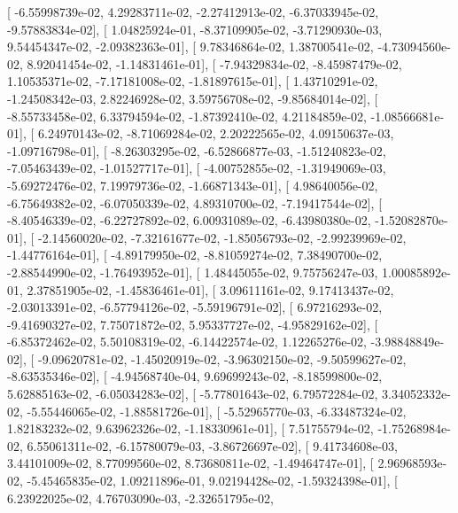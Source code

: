 \documentclass{article}
\begin{document}
       [ -6.55998739e-02,   4.29283711e-02,  -2.27412913e-02,
         -6.37033945e-02,  -9.57883834e-02],
       [  1.04825924e-01,  -8.37109905e-02,  -3.71290930e-03,
          9.54454347e-02,  -2.09382363e-01],
       [  9.78346864e-02,   1.38700541e-02,  -4.73094560e-02,
          8.92041454e-02,  -1.14831461e-01],
       [ -7.94329834e-02,  -8.45987479e-02,   1.10535371e-02,
         -7.17181008e-02,  -1.81897615e-01],
       [  1.43710291e-02,  -1.24508342e-03,   2.82246928e-02,
          3.59756708e-02,  -9.85684014e-02],
       [ -8.55733458e-02,   6.33794594e-02,  -1.87392410e-02,
          4.21184859e-02,  -1.08566681e-01],
       [  6.24970143e-02,  -8.71069284e-02,   2.20222565e-02,
          4.09150637e-03,  -1.09716798e-01],
       [ -8.26303295e-02,  -6.52866877e-03,  -1.51240823e-02,
         -7.05463439e-02,  -1.01527717e-01],
       [ -4.00752855e-02,  -1.31949069e-03,  -5.69272476e-02,
          7.19979736e-02,  -1.66871343e-01],
       [  4.98640056e-02,  -6.75649382e-02,  -6.07050339e-02,
          4.89310700e-02,  -7.19417544e-02],
       [ -8.40546339e-02,  -6.22727892e-02,   6.00931089e-02,
         -6.43980380e-02,  -1.52082870e-01],
       [ -2.14560020e-02,  -7.32161677e-02,  -1.85056793e-02,
         -2.99239969e-02,  -1.44776164e-01],
       [ -4.89179950e-02,  -8.81059274e-02,   7.38490700e-02,
         -2.88544990e-02,  -1.76493952e-01],
       [  1.48445055e-02,   9.75756247e-03,   1.00085892e-01,
          2.37851905e-02,  -1.45836461e-01],
       [  3.09611161e-02,   9.17413437e-02,  -2.03013391e-02,
         -6.57794126e-02,  -5.59196791e-02],
       [  6.97216293e-02,  -9.41690327e-02,   7.75071872e-02,
          5.95337727e-02,  -4.95829162e-02],
       [ -6.85372462e-02,   5.50108319e-02,  -6.14422574e-02,
          1.12265276e-02,  -3.98848849e-02],
       [ -9.09620781e-02,  -1.45020919e-02,  -3.96302150e-02,
         -9.50599627e-02,  -8.63535346e-02],
       [ -4.94568740e-04,   9.69699243e-02,  -8.18599800e-02,
          5.62885163e-02,  -6.05034283e-02],
       [ -5.77801643e-02,   6.79572284e-02,   3.34052332e-02,
         -5.55446065e-02,  -1.88581726e-01],
       [ -5.52965770e-03,  -6.33487324e-02,   1.82183232e-02,
          9.63962326e-02,  -1.18330961e-01],
       [  7.51755794e-02,  -1.75268984e-02,   6.55061311e-02,
         -6.15780079e-03,  -3.86726697e-02],
       [  9.41734608e-03,   3.44101009e-02,   8.77099560e-02,
          8.73680811e-02,  -1.49464747e-01],
       [  2.96968593e-02,  -5.45465835e-02,   1.09211896e-01,
          9.02194428e-02,  -1.59324398e-01],
       [  6.23922025e-02,   4.76703090e-03,  -2.32651795e-02,
\end{document}

